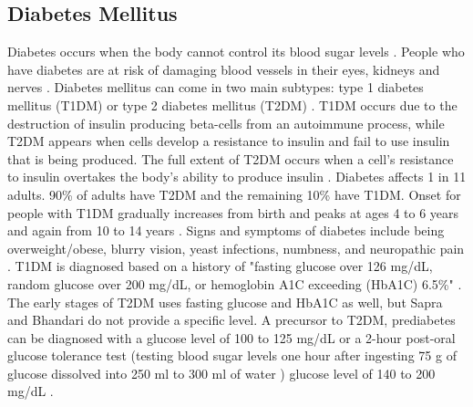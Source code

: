 \subsection{Diabetes Mellitus}
Diabetes occurs when the body cannot control its blood sugar levels \cite{sapra_diabetes_2021}. People who have diabetes are at risk of damaging blood vessels in their eyes, kidneys and nerves \cite{sapra_diabetes_2021}. Diabetes mellitus can come in two main subtypes: type 1 diabetes mellitus (T1DM) or type 2 diabetes mellitus (T2DM) \cite{sapra_diabetes_2021}. T1DM occurs due to the destruction of insulin producing beta-cells from an autoimmune process, while T2DM appears when cells develop a resistance to insulin and fail to use insulin that is being produced. The full extent of T2DM occurs when a cell’s resistance to insulin overtakes the body’s ability to produce insulin \cite{sapra_diabetes_2021}. Diabetes affects 1 in 11 adults. 90\% of adults have T2DM and the remaining 10\% have T1DM. Onset for people with T1DM gradually increases from birth and peaks at ages 4 to 6 years and again from 10 to 14 years \cite{sapra_diabetes_2021}. 
Signs and symptoms of diabetes include being overweight/obese, blurry vision, yeast infections, numbness, and neuropathic pain \cite{sapra_diabetes_2021}. T1DM is diagnosed based on a history of "fasting glucose over 126 mg/dL, random glucose over 200 mg/dL, or hemoglobin A1C exceeding (HbA1C) 6.5\%" \cite{sapra_diabetes_2021}. The early stages of T2DM uses fasting glucose and HbA1C as well, but Sapra and Bhandari do not provide a specific level. A precursor to T2DM, prediabetes can be diagnosed with a glucose level of 100 to 125 mg/dL or a 2-hour post-oral glucose tolerance test (testing blood sugar levels one hour after ingesting 75 g of glucose dissolved into 250 ml to 300 ml of water \cite{noauthor_glucose_2020}) glucose level of 140 to 200 mg/dL \cite{sapra_diabetes_2021}. 

